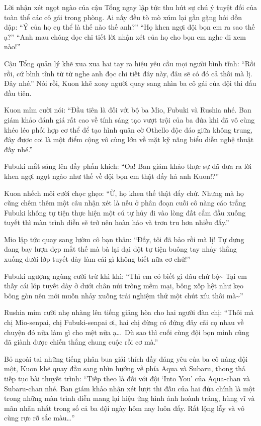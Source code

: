 \documentclass[../main.tex]{subfiles}
\begin{document}
Lời nhận xét ngọt ngào của cậu Tổng ngay lập tức thu hút sự chú ý tuyệt đối của toàn thể các cô gái trong phòng. Ai nấy đều tò mò xúm lại gần gặng hỏi dồn dập: ``Ý của họ cụ thể là thế nào thế anh?'' ``Họ khen ngợi đội bọn em ra sao thế ạ?'' ``Anh mau chóng đọc chi tiết lời nhận xét của họ cho bọn em nghe đi xem nào!''

Cậu Tổng quản lý khẽ xua xua hai tay ra hiệu yêu cầu mọi người bình tĩnh: ``Rồi rồi, cứ bình tĩnh từ từ nghe anh đọc chi tiết đây này, đâu sẽ có đó cả thôi mà lị. Đây nhé.'' Nói rồi, Kuon khẽ xoay người quay sang nhìn ba cô gái của đội thi đấu đầu tiên.

Kuon mỉm cười nói: ``Đầu tiên là đối với bộ ba Mio, Fubuki và Rushia nhé. Ban giám khảo đánh giá rất cao về tính sáng tạo vượt trội của ba đứa khi đã vô cùng khéo léo phối hợp cơ thể để tạo hình quân cờ Othello độc đáo giữa không trung, đây được coi là một điểm cộng vô cùng lớn về mặt kỹ năng biểu diễn nghệ thuật đấy nhé.''

Fubuki mắt sáng lên đầy phấn khích: ``Oa! Ban giám khảo thực sự đã đưa ra lời khen ngợi ngọt ngào như thế về đội bọn em thật đấy hả anh Kuon!?''

Kuon nhếch môi cười chọc ghẹo: ``Ừ, họ khen thế thật đấy chứ. Nhưng mà họ cũng chêm thêm một câu nhận xét là nếu ở phân đoạn cuối cô nàng cáo trắng Fubuki không tự tiện thực hiện một cú tự hủy đi vào lòng đất cắm đầu xuống tuyết thì màn trình diễn sẽ trở nên hoàn hảo và trơn tru hơn nhiều đấy.''

Mio lập tức quay sang lườm cô bạn thân: ``Đấy, tôi đã bảo rồi mà lị! Tự dưng đang bay lượn đẹp mắt thế mà bà lại dại dột tự tiện buông tay nhảy thẳng xuống dưới lớp tuyết dày làm cái gì không biết nữa cơ chứ!''

Fubuki ngượng ngùng cười trừ khì khì: ``Thì em có biết gì đâu chứ bộ\~{} Tại em thấy cái lớp tuyết dày ở dưới chân núi trông mềm mại, bông xốp hệt như kẹo bông gòn nên mới muốn nhảy xuống trải nghiệm thử một chút xíu thôi mà\~{}''

Rushia mỉm cười nhẹ nhàng lên tiếng giảng hòa cho hai người đàn chị: ``Thôi mà chị Mio-senpai, chị Fubuki-senpai ơi, hai chị đừng có đứng đây cãi cọ nhau về chuyện đó nữa làm gì cho mệt nữa ạ\dots\ Dù sao thì cuối cùng đội bọn mình cũng đã giành được chiến thắng chung cuộc rồi cơ mà.''

Bỏ ngoài tai những tiếng phân bua giải thích đầy đáng yêu của ba cô nàng đội một, Kuon khẽ quay đầu sang nhìn hướng về phía Aqua và Subaru, thong thả tiếp tục bài thuyết trình: ``Tiếp theo là đối với đội `Into You' của Aqua-chan và Subaru-chan nhé. Ban giám khảo nhận xét lượt thi đấu của hai đứa chính là một trong những màn trình diễn mang lại hiệu ứng hình ảnh hoành tráng, hùng vĩ và mãn nhãn nhất trong số cả ba đội ngày hôm nay luôn đấy. Rất lộng lẫy và vô cùng rực rỡ sắc màu\dots''
\end{document}
